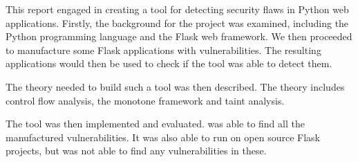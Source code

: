 This report engaged in creating a tool for detecting security flaws in Python web applications.
Firstly, the background for the project was examined, including the Python programming language and the Flask web framework.
We then proceeded to manufacture some Flask applications with vulnerabilities.
The resulting applications would then be used to check if the tool was able to detect them.

The theory needed to build such a tool was then described.
The theory includes control flow analysis, the monotone framework and taint analysis.

The tool \pyt{} was then implemented and evaluated.
\pyt{} was able to find all the manufactured vulnerabilities.
It was also able to run on open source Flask projects, but was not able to find any vulnerabilities in these.
